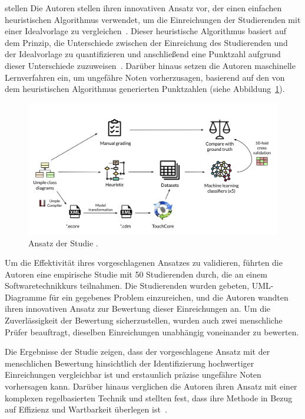 stellen Die Autoren stellen ihren innovativen Ansatz vor, der einen einfachen heuristischen Algorithmus verwendet, um
die Einreichungen der Studierenden mit einer Idealvorlage zu vergleichen~\cite{boubekeur2020automatic}. Dieser
heuristische Algorithmus basiert auf dem Prinzip, die Unterschiede zwischen der Einreichung des Studierenden und der
Idealvorlage zu quantifizieren und anschließend eine Punktzahl aufgrund dieser Unterschiede zuzuweisen~\cite{huyck1993efficient}.
Darüber hinaus setzen die Autoren maschinelle Lernverfahren ein, um ungefähre Noten vorherzusagen, basierend auf den von
dem heuristischen Algorithmus generierten Punktzahlen (siehe Abbildung~\ref{fig:ml-approach}).

\begin{figure}
	\centering
	\includegraphics[width=14cm]{images/ml-approach}
	\caption{Ansatz der Studie \cite{boubekeur2020automatic}.}
	\label{fig:ml-approach}
\end{figure}

Um die Effektivität ihres vorgeschlagenen Ansatzes zu validieren, führten die Autoren eine empirische Studie mit 50
Studierenden durch, die an einem Softwaretechnikkurs teilnahmen. Die Studierenden wurden gebeten, UML-Diagramme für ein
gegebenes Problem einzureichen, und die Autoren wandten ihren innovativen Ansatz zur Bewertung dieser Einreichungen an.
Um die Zuverlässigkeit der Bewertung sicherzustellen, wurden auch zwei menschliche Prüfer beauftragt, dieselben
Einreichungen unabhängig voneinander zu bewerten.

Die Ergebnisse der Studie zeigen, dass der vorgeschlagene Ansatz mit der menschlichen Bewertung hinsichtlich der
Identifizierung hochwertiger Einreichungen vergleichbar ist und erstaunlich präzise ungefähre Noten vorhersagen kann.
Darüber hinaus verglichen die Autoren ihren Ansatz mit einer komplexen regelbasierten Technik und stellten fest, dass
ihre Methode in Bezug auf Effizienz und Wartbarkeit überlegen ist~\cite{boubekeur2020automatic}.

